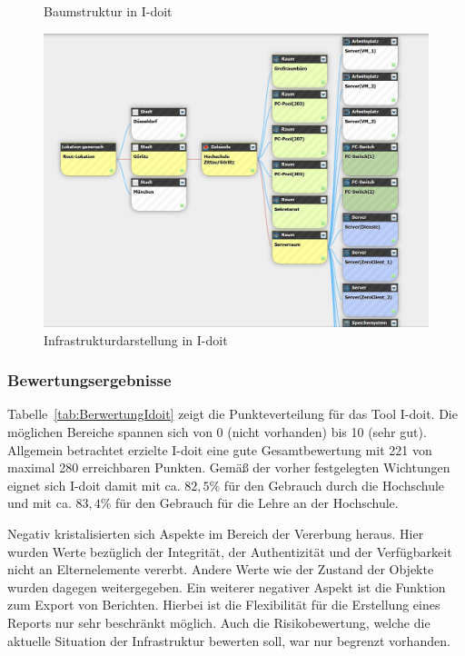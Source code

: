 \begin{figure}[htbp]
\caption{Baumstruktur in I-doit}
\label{fig:idoittree}
\end{figure}

\begin{figure}[htbp]
\includegraphics[width=\textwidth]{images/idoitschema}
\caption{Infrastrukturdarstellung in I-doit}
\label{fig:idoitschema}
\end{figure}


\subsubsection{Bewertungsergebnisse}
Tabelle~\ref{tab:BerwertungIdoit} zeigt die Punkteverteilung für das Tool I-doit. 
Die möglichen Bereiche spannen sich von 0 (nicht vorhanden) bis 10 (sehr gut).
Allgemein betrachtet erzielte I-doit eine gute Gesamtbewertung mit 221 von maximal 280 erreichbaren Punkten.
Gemäß der vorher festgelegten Wichtungen eignet sich I-doit damit mit ca. $82,5\%$ für den Gebrauch durch die Hochschule und mit ca. $83,4\%$ für den Gebrauch für die Lehre
an der Hochschule.

Negativ kristalisierten sich Aspekte im Bereich der Vererbung heraus. Hier wurden Werte bezüglich der Integrität, der Authentizität und der Verfügbarkeit nicht an 
Elternelemente vererbt. Andere Werte wie der Zustand der Objekte wurden dagegen weitergegeben.
Ein weiterer negativer Aspekt ist die Funktion zum Export von Berichten. Hierbei ist die Flexibilität für die Erstellung eines Reports nur sehr beschränkt möglich.
Auch die Risikobewertung, welche die aktuelle Situation der Infrastruktur bewerten soll, war nur begrenzt vorhanden. 

